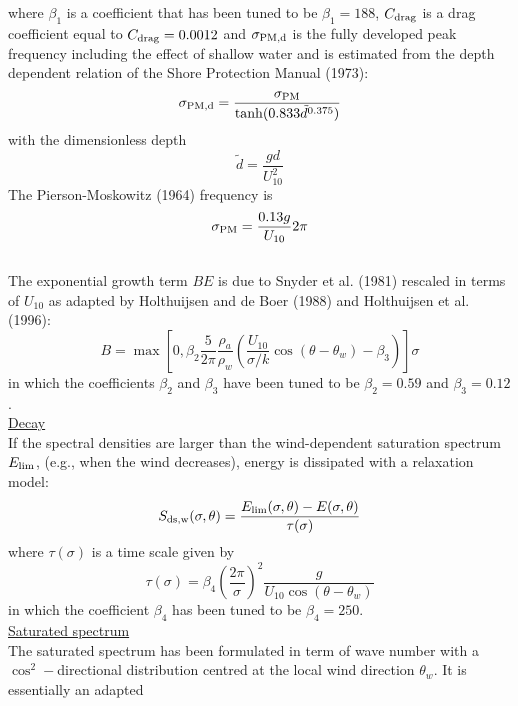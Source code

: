 \documentclass[12pt]{book}
\begin{document}
where $\beta_1$ is a coefficient that has been tuned to be $\beta_1 = 188$,
$C_{\rm drag}$ is a drag coefficient equal to $C_{\rm drag} = 0.0012$ and
$\sigma_{\rm PM,d}$ is the fully developed peak frequency including the effect of shallow
water and is estimated from the depth dependent
relation of the Shore Protection Manual (1973):
\begin{equation}
  \sigma_{\rm PM,d} = \frac{\sigma_{\rm PM}}{\tanh(0.833 {\tilde d}^{0.375})}
\end{equation}
with the dimensionless depth
\begin{equation}
  {\tilde d} = \frac{gd}{U^2_{10}}
\end{equation}
The Pierson-Moskowitz (1964) frequency is
\begin{equation}
  \sigma_{\rm PM} = \frac{0.13g}{U_{10}} 2\pi
\end{equation}
\nocite{Hol96BB,CER73}
\\[2ex]
\noindent
The exponential growth term $B E$ is due to Snyder et al. (1981) rescaled in terms of $U_{10}$ as
adapted by Holthuijsen and de Boer (1988) and Holthuijsen et al. (1996):
\begin{equation}
  B = \max [0, \beta_2 \frac{5}{2\pi} \frac{\rho_a}{\rho_w} (\frac{U_{10}}{\sigma/k}\cos(\theta-\theta_w) -\beta_3)]\sigma
\end{equation}
in which the coefficients $\beta_2$ and $\beta_3$ have been tuned to be $\beta_2 = 0.59$ and $\beta_3 = 0.12$.
\\[2ex]
\noindent
\underline{Decay}\\[2ex]
If the spectral densities are larger than the wind-dependent saturation spectrum $E_{\rm lim}$, (e.g.,
when the wind decreases), energy is dissipated with a relaxation model:
\begin{equation}
  S_{\rm ds,w} (\sigma,\theta)= \frac{E_{\rm lim}(\sigma,\theta) - E(\sigma,\theta)}{\tau(\sigma)}
\end{equation}
where $\tau(\sigma)$ is a time scale given by
\begin{equation}
  \tau(\sigma) = \beta_4 \left(\frac{2\pi}{\sigma}\right)^2 \frac{g}{U_{10}\cos(\theta - \theta_w)}
\end{equation}
in which the coefficient $\beta_4$ has been tuned to be $\beta_4 = 250$.
\\[2ex]
\noindent
\underline{Saturated spectrum}\\[2ex]
The saturated spectrum has been formulated in term of wave number with a $\cos^2-$directional
distribution centred at the local wind direction $\theta_w$. It is essentially an adapted
\end{document}
